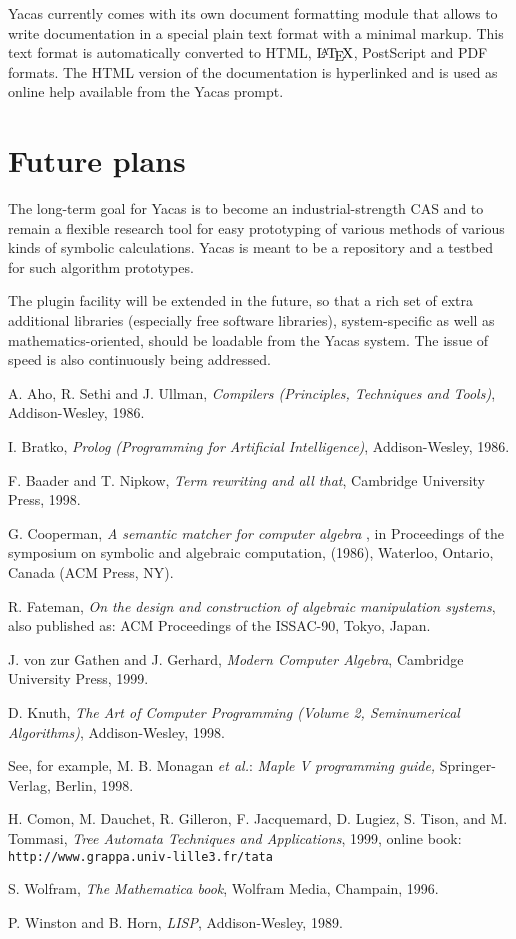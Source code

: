 \documentclass{llncs}
\begin{document}
Yacas currently comes with its own document formatting module that allows to write
documentation in a special plain text format with a minimal markup. This text format is
automatically converted to HTML, $\textrm{\LaTeX\/}$, PostScript and PDF formats. The HTML
version of the documentation is hyperlinked and is used as online help
available from the Yacas prompt.


\section{Future plans}
The long-term goal for Yacas is to become an industrial-strength CAS and to
remain a flexible research tool for easy prototyping of various methods of
various kinds of symbolic calculations. Yacas is meant to be a repository and a
testbed for such algorithm prototypes.


The plugin facility will be extended in the future, so that a rich set of extra
additional libraries (especially free software libraries), system-specific as
well as mathematics-oriented, should be loadable from the Yacas system. The
issue of speed is also continuously being addressed. 


\begin{thebibliography}{10}

 A. Aho, R. Sethi and J. Ullman, \emph{Compilers (Principles, Techniques and Tools)}, Addison-Wesley, 1986.


 I. Bratko, \emph{Prolog (Programming for Artificial Intelligence)}, Addison-Wesley, 1986.


 F. Baader and T. Nipkow, \emph{Term rewriting and all that}, Cambridge University Press, 1998.


 G. Cooperman, \emph{A semantic matcher for computer algebra }, in Proceedings of the symposium on symbolic and algebraic computation, (1986), Waterloo, Ontario, Canada (ACM Press, NY).


 R. Fateman, \emph{On the design and construction of algebraic manipulation systems}, also published as: ACM Proceedings of the ISSAC-90, Tokyo, Japan.


 J. von zur Gathen and J. Gerhard, \emph{Modern Computer Algebra}, Cambridge University Press, 1999.


 D. Knuth, \emph{The Art of Computer Programming (Volume 2, Seminumerical Algorithms)}, Addison-Wesley, 1998.


 See, for example, M. B. Monagan \emph{et al.}: \emph{Maple V programming guide,} Springer-Verlag, Berlin, 1998.


 H. Comon, M. Dauchet, R. Gilleron, F. Jacquemard, D. Lugiez, S. Tison, and M. Tommasi, \emph{Tree Automata Techniques and Applications}, 1999, online book: {\small \verb|http://www.grappa.univ-lille3.fr/tata|}


 S. Wolfram, \emph{The Mathematica book}, Wolfram Media, Champain, 1996.


 P. Winston and B. Horn, \emph{LISP}, Addison-Wesley, 1989.


\end{thebibliography}
\end{document}

